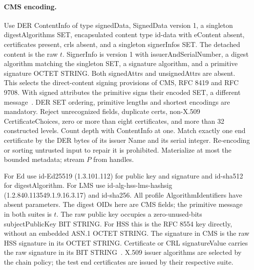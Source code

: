 \documentclass[10pt,twocolumn,letterpaper]{article}
\begin{document}
\paragraph{CMS encoding.}
Use DER ContentInfo of type signedData, SignedData version 1, a singleton digestAlgorithms SET, encapsulated content type id-data with eContent absent, certificates present, crls absent, and a singleton signerInfos SET. The detached content is the raw $t$. SignerInfo is version 1 with issuerAndSerialNumber, a digest algorithm matching the singleton SET, a signature algorithm, and a primitive signature OCTET STRING. Both signedAttrs and unsignedAttrs are absent. This selects the direct-content signing provisions of CMS, RFC 8419 and RFC 9708. With signed attributes the primitive signs their encoded SET, a different message~\cite{cms,edcms,lmscms}. DER SET ordering, primitive lengths and shortest encodings are mandatory. Reject unrecognized fields, duplicate certs, non-X.509 CertificateChoices, zero or more than eight certificates, and more than 32 constructed levels. Count depth with ContentInfo at one. Match exactly one end certificate by the DER bytes of its issuer Name and its serial integer. Re-encoding or sorting untrusted input to repair it is prohibited. Materialize at most the bounded metadata; stream $P$ from handles.

For Ed use id-Ed25519 (1.3.101.112) for public key and signature and id-sha512 for digestAlgorithm. For LMS use id-alg-hss-lms-hashsig (1.2.840.113549.1.9.16.3.17) and id-sha256. All profile AlgorithmIdentifiers have absent parameters. The digest OIDs here are CMS fields; the primitive message in both suites is $t$. The raw public key occupies a zero-unused-bits subjectPublicKey BIT STRING. For HSS this is the RFC 8554 key directly, without an embedded ASN.1 OCTET STRING. The signature in CMS is the raw HSS signature in its OCTET STRING. Certificate or CRL signatureValue carries the raw signature in its BIT STRING~\cite{lmsx,edx}. X.509 issuer algorithms are selected by the chain policy; the test end certificates are issued by their respective suite.
\end{document}
